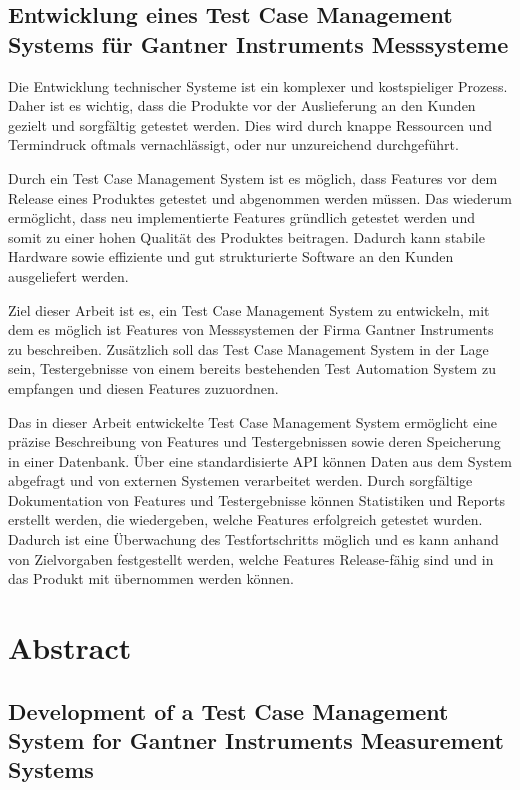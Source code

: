 \documentclass[a4paper, fontsize=11pt, parskip=half, twoside]{scrreprt}
\begin{document}
	\subsection*{Entwicklung eines Test Case Management Systems für Gantner Instruments Messsysteme}
	
	Die Entwicklung technischer Systeme ist ein komplexer und kostspieliger Prozess. 
	Daher ist es wichtig, dass die Produkte vor der Auslieferung an den Kunden gezielt und sorgfältig getestet werden. 
	Dies wird durch knappe Ressourcen und Termindruck oftmals vernachlässigt, oder nur unzureichend durchgeführt. 
	
	Durch ein Test Case Management System ist es möglich, dass Features vor dem Release eines Produktes getestet und abgenommen werden müssen. 
	Das wiederum ermöglicht, dass neu implementierte Features gründlich getestet werden und somit zu einer hohen Qualität des Produktes beitragen.
	Dadurch kann stabile Hardware sowie effiziente und gut strukturierte Software an den Kunden ausgeliefert werden.
	
	Ziel dieser Arbeit ist es, ein Test Case Management System zu entwickeln, mit dem es möglich ist Features von Messsystemen der Firma Gantner Instruments zu beschreiben.
	Zusätzlich soll das Test Case Management System in der Lage sein, Testergebnisse von einem bereits bestehenden Test Automation System zu empfangen und diesen Features zuzuordnen.
	
	Das in dieser Arbeit entwickelte Test Case Management System ermöglicht eine präzise Beschreibung von Features und Testergebnissen sowie deren Speicherung in einer Datenbank. 
	Über eine standardisierte API können Daten aus dem System abgefragt und von externen Systemen verarbeitet werden. 
	Durch sorgfältige Dokumentation von Features und Testergebnisse können Statistiken und Reports erstellt werden, die wiedergeben, welche Features erfolgreich getestet wurden.
	Dadurch ist eine Überwachung des Testfortschritts möglich und es kann anhand von Zielvorgaben festgestellt werden, welche Features Release-fähig sind und in das Produkt mit übernommen werden können.
	
	\newpage
	\section*{Abstract}
	\subsection*{Development of a Test Case Management System for Gantner Instruments Measurement Systems}
	
\end{document}
